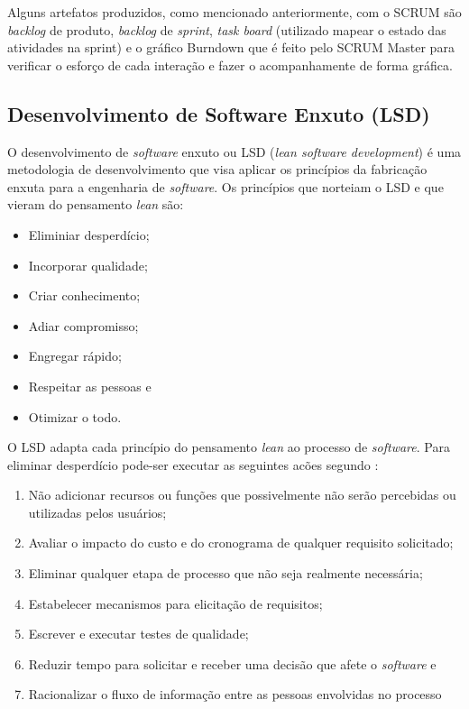 Alguns artefatos produzidos, como mencionado anteriormente, com o SCRUM são \textit{backlog} de produto, \textit{backlog} de \textit{sprint}, \textit{task board} (utilizado mapear o estado das atividades na sprint) e o gráfico Burndown que é feito pelo SCRUM Master para verificar o esforço de cada interação e fazer o acompanhamente de forma gráfica. \cite{macedo:12}

\subsection{Desenvolvimento de Software Enxuto (LSD)}

O desenvolvimento de \textit{software} enxuto ou LSD (\textit{lean software development}) é uma metodologia de desenvolvimento que visa aplicar os princípios da fabricação enxuta para a engenharia de \textit{software}. Os princípios que norteiam o LSD e que vieram do pensamento \textit{lean} são:

\begin{itemize}
	\item Eliminiar desperdício;
	\item Incorporar qualidade;
	\item Criar conhecimento;
	\item Adiar compromisso;
	\item Engregar rápido;
	\item Respeitar as pessoas e
	\item Otimizar o todo.
\end{itemize}

O LSD adapta cada princípio do pensamento \textit{lean} ao processo de \textit{software}. Para eliminar desperdício pode-ser executar as seguintes acões segundo :

\begin{enumerate}
	\item Não adicionar recursos ou funções que possivelmente não serão percebidas ou utilizadas pelos usuários;
	\item Avaliar o impacto do custo e do cronograma de qualquer requisito solicitado;
	\item Eliminar qualquer etapa de processo que não seja realmente necessária;
	\item Estabelecer mecanismos para elicitação de requisitos;
	\item Escrever e executar testes de qualidade;
	\item Reduzir tempo para solicitar e receber uma decisão que afete o \textit{software} e
	\item Racionalizar o fluxo de informação entre as pessoas envolvidas no processo
\end{enumerate}

